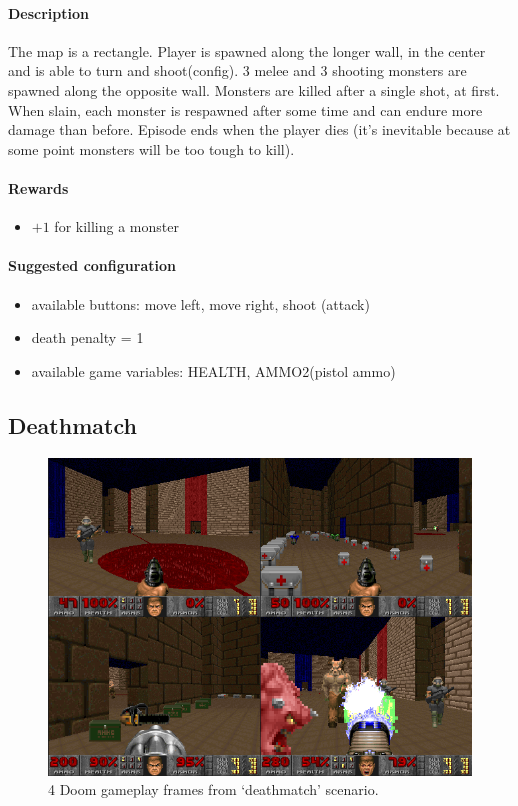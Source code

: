 \documentclass[english,bachelor,a4paper,twoside]{ppfcmthesis}
\begin{document}
		\paragraph{Description}
			The map is a rectangle. Player is spawned along the longer wall, in the center and is able to turn and shoot(config). 3 melee and 3 shooting monsters are spawned along the opposite wall. Monsters are killed after a single shot, at first. When slain, each monster is respawned after some time and can endure more damage than before. Episode ends when the player dies (it's inevitable because at some point monsters will be too tough to kill).
		\paragraph{Rewards}
			\begin{itemize}
				\item $+1$ for killing a monster
			\end{itemize}

		\paragraph{Suggested configuration}
			\begin{itemize}
				\item available buttons: move left, move right, shoot (attack)
				\item death penalty = 1
				\item available game variables: HEALTH, AMMO2(pistol ammo)
			\end{itemize}
	\newpage

	\subsection{Deathmatch}
		\begin{figure}
			\centering
			\includegraphics[scale=0.5]{deathmatch.png}
			\caption{4 Doom gameplay frames from `deathmatch' scenario.}\label{fig:deatchmatch}
		\end{figure}
\end{document}
